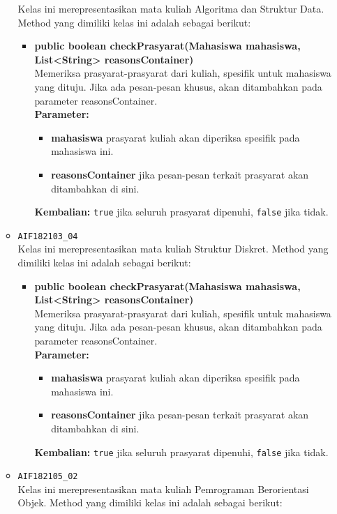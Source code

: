 \begin{enumerate}
\begin{itemize}
		Kelas ini merepresentasikan mata kuliah Algoritma dan Struktur Data. Method yang dimiliki kelas ini adalah sebagai berikut: 
		\begin{itemize}
			\item \textbf{public boolean checkPrasyarat(Mahasiswa mahasiswa, List<String> reasonsContainer)}\\
			Memeriksa prasyarat-prasyarat dari kuliah, spesifik untuk mahasiswa yang dituju. Jika ada pesan-pesan khusus, akan ditambahkan pada parameter reasonsContainer.\\
			\textbf{Parameter:}
			\begin{itemize}
				\item \textbf{mahasiswa} prasyarat kuliah akan diperiksa spesifik pada mahasiswa ini.
				\item \textbf{reasonsContainer} jika pesan-pesan terkait prasyarat akan ditambahkan di sini.
			\end{itemize}
			\textbf{Kembalian:} \texttt{true} jika seluruh prasyarat dipenuhi, \texttt{false} jika tidak.
		\end{itemize}
		\item \texttt{AIF182103\_04} \\
		Kelas ini merepresentasikan mata kuliah Struktur Diskret. Method yang dimiliki kelas ini adalah sebagai berikut: 
		\begin{itemize}
			\item \textbf{public boolean checkPrasyarat(Mahasiswa mahasiswa, List<String> reasonsContainer)}\\
			Memeriksa prasyarat-prasyarat dari kuliah, spesifik untuk mahasiswa yang dituju. Jika ada pesan-pesan khusus, akan ditambahkan pada parameter reasonsContainer.\\
			\textbf{Parameter:}
			\begin{itemize}
				\item \textbf{mahasiswa} prasyarat kuliah akan diperiksa spesifik pada mahasiswa ini.
				\item \textbf{reasonsContainer} jika pesan-pesan terkait prasyarat akan ditambahkan di sini.
			\end{itemize}
			\textbf{Kembalian:} \texttt{true} jika seluruh prasyarat dipenuhi, \texttt{false} jika tidak.
		\end{itemize}
		\item \texttt{AIF182105\_02} \\
		Kelas ini merepresentasikan mata kuliah Pemrograman Berorientasi Objek. Method yang dimiliki kelas ini adalah sebagai berikut: 

\end{itemize}
\end{enumerate}
